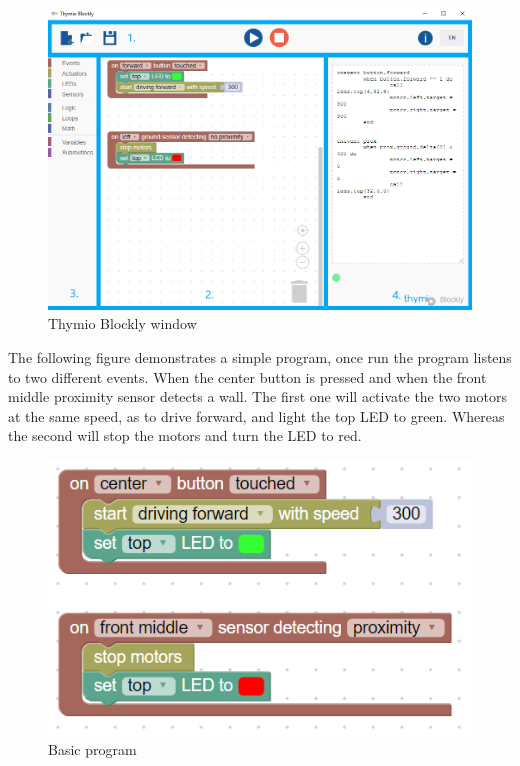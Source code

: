 \documentclass{scrartcl}
\begin{document}
\begin{figure}
  \centering
  \includegraphics[scale=0.5]{./Blockly/blockly_window}
  \caption{Thymio Blockly window}
  \label{fig:thymio_blockly_window}
\end{figure}

The following figure demonstrates a simple program, once run the program listens to two different events. When the center button is pressed and when the front middle proximity sensor detects a wall. 
The first one will activate the two motors at the same speed, as to drive forward, and light the top LED to green. Whereas the second will stop the motors and turn the LED to red. \\
\begin{figure}
  \centering
  \includegraphics[scale=0.5]{./Blockly/forward_stop_wall}
  \caption{Basic program}
  \label{fig:thymio_blockly_basic_program}
\end{figure}
\end{document}
